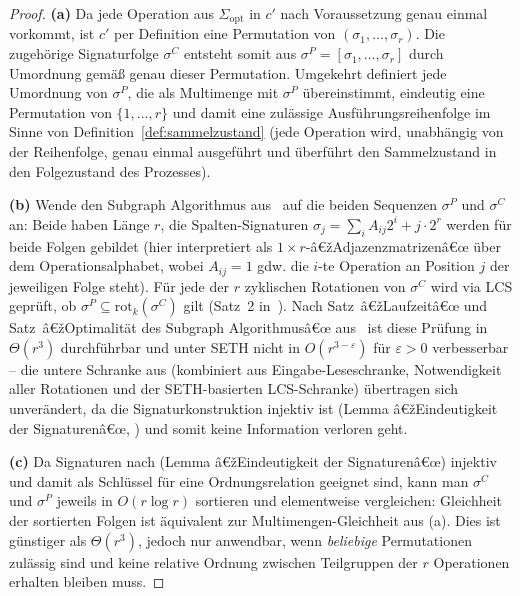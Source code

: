 ﻿\documentclass[a4paper,12pt]{article}
\theoremstyle{definition}
\begin{document}
\begin{proof}
	\textbf{(a)} Da jede Operation aus $\Sigma_{\mathrm{opt}}$ in $c'$ nach Voraussetzung
	genau einmal vorkommt, ist $c'$ per Definition eine Permutation von
	$(\sigma_1,\ldots,\sigma_r)$. Die zugehörige Signaturfolge $\sigma^{C}$ entsteht somit
	aus $\sigma^{P}=[\sigma_1,\ldots,\sigma_r]$ durch Umordnung gemäß genau dieser
	Permutation. Umgekehrt definiert jede Umordnung von $\sigma^{P}$, die als Multimenge
	mit $\sigma^{P}$ übereinstimmt, eindeutig eine Permutation von
	$\{1,\ldots,r\}$ und damit eine zulässige Ausführungsreihenfolge im Sinne von
	Definition~\ref{def:sammelzustand} (jede Operation wird, unabhängig von der
	Reihenfolge, genau einmal ausgeführt und überführt den Sammelzustand in den
	Folgezustand des Prozesses).

	\textbf{(b)} Wende den Subgraph Algorithmus aus~\cite{epp2026subgraph} auf die beiden
	Sequenzen $\sigma^{P}$ und $\sigma^{C}$ an: Beide haben Länge $r$, die
	Spalten-Signaturen $\sigma_j = \sum_i A_{ij}2^i + j\cdot 2^r$ werden für beide Folgen
	gebildet (hier interpretiert als $1\times r$-â€žAdjazenzmatrizenâ€œ über dem
	Operationsalphabet, wobei $A_{ij}=1$ gdw. die $i$-te Operation an Position $j$ der
	jeweiligen Folge steht). Für jede der $r$ zyklischen Rotationen von $\sigma^{C}$ wird
	via LCS geprüft, ob $\sigma^{P}\subseteq\mathrm{rot}_k(\sigma^{C})$ gilt
	(Satz~2 in~\cite{epp2026subgraph}). Nach Satz~â€žLaufzeitâ€œ und
	Satz~â€žOptimalität des Subgraph Algorithmusâ€œ aus~\cite{epp2026subgraph} ist diese
	Prüfung in $\Theta(r^3)$ durchführbar und unter SETH nicht in
	$O(r^{3-\varepsilon})$ für $\varepsilon>0$ verbesserbar -- die untere Schranke aus
	\cite{epp2026subgraph} (kombiniert aus Eingabe-Leseschranke, Notwendigkeit aller
	Rotationen und der SETH-basierten LCS-Schranke) übertragen sich unverändert, da die
	Signaturkonstruktion injektiv ist (Lemma â€žEindeutigkeit der Signaturenâ€œ,
	\cite{epp2026subgraph}) und somit keine Information verloren geht.

	\textbf{(c)} Da Signaturen nach \cite{epp2026subgraph} (Lemma â€žEindeutigkeit der
	Signaturenâ€œ) injektiv und damit als Schlüssel für eine Ordnungsrelation geeignet sind,
	kann man $\sigma^{C}$ und $\sigma^{P}$ jeweils in $O(r\log r)$ sortieren und
	elementweise vergleichen: Gleichheit der sortierten Folgen ist äquivalent zur
	Multimengen-Gleichheit aus (a). Dies ist günstiger als $\Theta(r^3)$, jedoch nur
	anwendbar, wenn \emph{beliebige} Permutationen zulässig sind und keine relative
	Ordnung zwischen Teilgruppen der $r$ Operationen erhalten bleiben muss. \qedhere
\end{proof}
\end{document}
